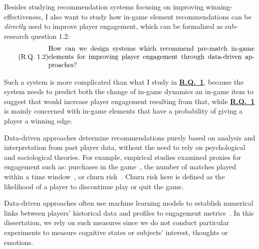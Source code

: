 

Besides studying recommendation systems focusing on improving winning-effectiveness, I also want to study how in-game element recommendations can be \textit{directly} used to improve player engagement, which can be formalized as sub-research question 1.2:
\begin{equation}
  \tag{R.Q. 1.2}\label{rq2}
  \parbox{\dimexpr\linewidth-4em}{%
    \strut
    How can we design systems which recommend pre-match in-game elements for improving player engagement through data-driven approaches?
    \strut
  }
\end{equation}

Such a system is more complicated than what I study in \hyperref[rq1]{\textbf{R.Q.~1}}, because the system needs to predict both the change of in-game dynamics an in-game item to suggest that would increase player engagement resulting from that, while \hyperref[rq1]{\textbf{R.Q.~1}} is mainly concerned with in-game elements that have a probability of giving a player a winning edge. 

Data-driven approaches determine recommendations purely based on analysis and interpretation from past player data, without the need to rely on psychological and sociological theories. For example, empirical studies examined proxies for engagement such as: purchases in the game~\cite{xie2015predicting,sifa2015predicting}, the number of matches played within a time window~\cite{xue2017dynamic,weber2011modeling,}, or churn risk~\cite{hadiji2014predicting,harrison2012players}. Churn risk here is defined as the likelihood of a player to discontinue play or quit the game. 

Data-driven approaches often use machine learning models to establish numerical links between players' historical data and profiles to engagement metrics~\cite{yannakakis2013player}. In this dissertation, we rely on such measures since we do not conduct particular experiments to measure cognitive states or subjects' interest, thoughts or emotions. 


